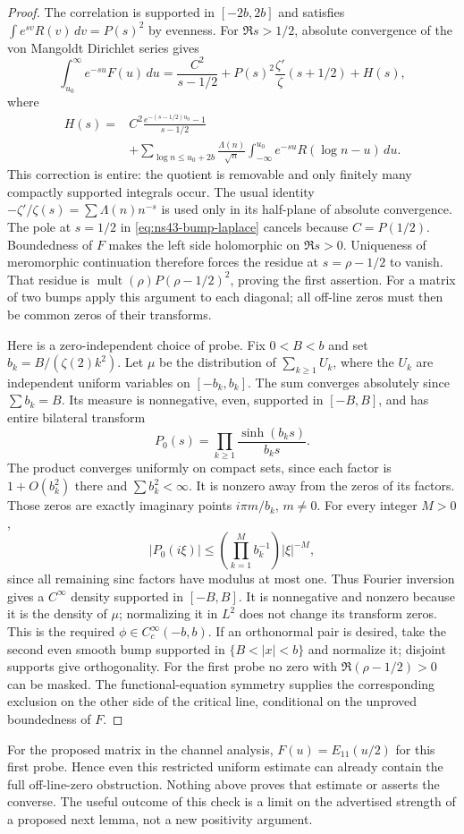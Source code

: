 \begin{proof}
The correlation is supported in $[-2b,2b]$ and satisfies
$\int e^{sv}R(v)\,dv=P(s)^2$ by evenness. For $\Re s>1/2$,
absolute convergence of the von Mangoldt Dirichlet series gives
\begin{equation}\label{eq:ns43-bump-laplace}
 \int_{u_0}^{\infty}e^{-su}F(u)\,du
 =\frac{C^2}{s-1/2}+P(s)^2\frac{\zeta'}{\zeta}(s+1/2)+H(s),
\end{equation}
where
\begin{align*}
 H(s)={}&C^2\frac{e^{-(s-1/2)u_0}-1}{s-1/2}\\
 &+\sum_{\log n\le u_0+2b}\frac{\Lambda(n)}{\sqrt n}
       \int_{-\infty}^{u_0}e^{-su}R(\log n-u)\,du.
\end{align*}
This correction is entire: the quotient is removable and only
finitely many compactly supported integrals occur. The usual
identity $-\zeta'/\zeta(s)=\sum\Lambda(n)n^{-s}$ is used only in
its half-plane of absolute convergence. The pole at $s=1/2$ in
\eqref{eq:ns43-bump-laplace} cancels because $C=P(1/2)$.
Boundedness of $F$ makes the left side holomorphic on $\Re s>0$.
Uniqueness of meromorphic continuation therefore forces the residue
at $s=\rho-1/2$ to vanish. That residue is
$\operatorname{mult}(\rho)P(\rho-1/2)^2$, proving the first assertion.
For a matrix of two bumps apply this argument to each diagonal;
all off-line zeros must then be common zeros of their transforms.

Here is a zero-independent choice of probe. Fix $0<B<b$ and set
$b_k=B/(\zeta(2)k^2)$. Let $\mu$ be the distribution of
$\sum_{k\ge1}U_k$, where the $U_k$ are independent uniform variables
on $[-b_k,b_k]$. The sum converges absolutely since $\sum b_k=B$.
Its measure is nonnegative, even, supported in $[-B,B]$, and has
entire bilateral transform
\[
 P_0(s)=\prod_{k\ge1}\frac{\sinh(b_ks)}{b_ks}.
\]
The product converges uniformly on compact sets, since each factor
is $1+O(b_k^2)$ there and $\sum b_k^2<\infty$. It is nonzero away
from the zeros of its factors. Those zeros are exactly imaginary
points $i\pi m/b_k$, $m\ne0$.
For every integer $M>0$,
\[
 |P_0(i\xi)|\le
 \left(\prod_{k=1}^M b_k^{-1}\right)|\xi|^{-M},
\]
since all remaining sinc factors have modulus at most one. Thus
Fourier inversion gives a $C^\infty$ density supported in $[-B,B]$.
It is nonnegative and nonzero because it is the density of $\mu$;
normalizing it in $L^2$ does not change its transform zeros. This is
the required $\phi\in C_c^\infty(-b,b)$. If an orthonormal pair is
desired, take the second even smooth bump supported in
$\{B<|x|<b\}$ and normalize it; disjoint supports give orthogonality.
For the first probe no zero with $\Re(\rho-1/2)>0$ can be masked.
The functional-equation symmetry supplies the corresponding exclusion
on the other side of the critical line, conditional on the unproved
boundedness of $F$.
\end{proof}

For the proposed matrix in the channel analysis, $F(u)=E_{11}(u/2)$
for this first probe. Hence even this restricted uniform estimate can
already contain the full off-line-zero obstruction. Nothing above
proves that estimate or asserts the converse. The useful outcome of
this check is a limit on the advertised strength of a proposed next
lemma, not a new positivity argument.
